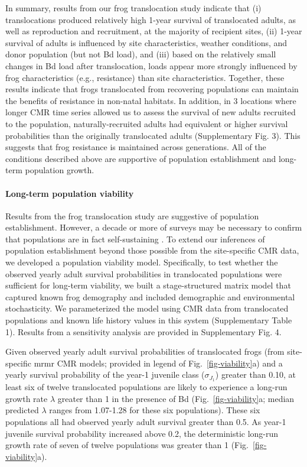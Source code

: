 \documentclass[
  letterpaper,
  DIV=11,
  numbers=noendperiod]{scrartcl}
\let\oldparagraph\paragraph
\renewcommand{\paragraph}[1]{\oldparagraph{#1}\mbox{}}
\begin{document}
In summary, results from our frog translocation study indicate that (i)
translocations produced relatively high 1-year survival of translocated
adults, as well as reproduction and recruitment, at the majority of
recipient sites, (ii) 1-year survival of adults is influenced by site
characteristics, weather conditions, and donor population (but not Bd
load), and (iii) based on the relatively small changes in Bd load after
translocation, loads appear more strongly influenced by frog
characteristics (e.g., resistance) than site characteristics. Together,
these results indicate that frogs translocated from recovering
populations can maintain the benefits of resistance in non-natal
habitats. In addition, in 3 locations where longer CMR time series
allowed us to assess the survival of new adults recruited to the
population, naturally-recruited adults had equivalent or higher survival
probabilities than the originally translocated adults (Supplementary
Fig. 3). This suggests that frog resistance is maintained across
generations. All of the conditions described above are supportive of
population establishment and long-term population growth.

\paragraph{Long-term population
viability}\label{long-term-population-viability}

Results from the frog translocation study are suggestive of population
establishment. However, a decade or more of surveys may be necessary to
confirm that populations are in fact self-sustaining \citep{joseph2018}.
To extend our inferences of population establishment beyond those
possible from the site-specific CMR data, we developed a population
viability model. Specifically, to test whether the observed yearly adult
survival probabilities in translocated populations were sufficient for
long-term viability, we built a stage-structured matrix model that
captured known frog demography and included demographic and
environmental stochasticity. We parameterized the model using CMR data
from translocated populations and known life history values in this
system (Supplementary Table 1). Results from a sensitivity analysis are
provided in Supplementary Fig. 4.

Given observed yearly adult survival probabilities of translocated frogs
(from site-specific mrmr CMR models; provided in legend of
Fig.~\ref{fig-viability}a) and a yearly survival probability of the
year-1 juvenile class (\(\sigma_{J_1}\)) greater than 0.10, at least six
of twelve translocated populations are likely to experience a long-run
growth rate \(\lambda\) greater than 1 in the presence of Bd
(Fig.~\ref{fig-viability}a; median predicted \(\lambda\) ranges from
1.07-1.28 for these six populations). These six populations all had
observed yearly adult survival greater than 0.5. As year-1 juvenile
survival probability increased above 0.2, the deterministic long-run
growth rate of seven of twelve populations was greater than 1
(Fig.~\ref{fig-viability}a).
\end{document}
